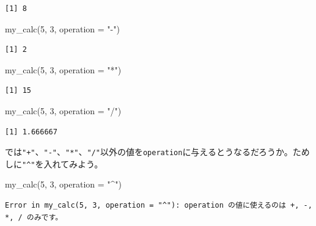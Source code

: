 \documentclass[
  a4paper,
  pandoc,
  ja=standard,
  jafont=haranoaji]{bxjsbook}
\newenvironment{Shaded}{\begin{snugshade}}{\end{snugshade}}
\newcommand{\AttributeTok}[1]{\textcolor[rgb]{0.00,0.48,0.65}{#1}}
\newcommand{\DecValTok}[1]{\textcolor[rgb]{0.68,0.00,0.00}{#1}}
\newcommand{\FunctionTok}[1]{\textcolor[rgb]{0.28,0.35,0.67}{#1}}
\newcommand{\NormalTok}[1]{\textcolor[rgb]{0.00,0.48,0.65}{#1}}
\newcommand{\StringTok}[1]{\textcolor[rgb]{0.13,0.47,0.30}{#1}}
\begin{document}
\begin{verbatim}
[1] 8
\end{verbatim}

\begin{Shaded}
\begin{Highlighting}[numbers=left,,]
\FunctionTok{my\_calc}\NormalTok{(}\DecValTok{5}\NormalTok{, }\DecValTok{3}\NormalTok{, }\AttributeTok{operation =} \StringTok{"{-}"}\NormalTok{)}
\end{Highlighting}
\end{Shaded}

\begin{verbatim}
[1] 2
\end{verbatim}

\begin{Shaded}
\begin{Highlighting}[numbers=left,,]
\FunctionTok{my\_calc}\NormalTok{(}\DecValTok{5}\NormalTok{, }\DecValTok{3}\NormalTok{, }\AttributeTok{operation =} \StringTok{"*"}\NormalTok{)}
\end{Highlighting}
\end{Shaded}

\begin{verbatim}
[1] 15
\end{verbatim}

\begin{Shaded}
\begin{Highlighting}[numbers=left,,]
\FunctionTok{my\_calc}\NormalTok{(}\DecValTok{5}\NormalTok{, }\DecValTok{3}\NormalTok{, }\AttributeTok{operation =} \StringTok{"/"}\NormalTok{)}
\end{Highlighting}
\end{Shaded}

\begin{verbatim}
[1] 1.666667
\end{verbatim}

では\texttt{"+"}、\texttt{"-"}、\texttt{"*"}、\texttt{"/"}以外の値を\texttt{operation}に与えるとうなるだろうか。ためしに\texttt{"\^{}"}を入れてみよう。

\begin{Shaded}
\begin{Highlighting}[numbers=left,,]
\FunctionTok{my\_calc}\NormalTok{(}\DecValTok{5}\NormalTok{, }\DecValTok{3}\NormalTok{, }\AttributeTok{operation =} \StringTok{"\^{}"}\NormalTok{)}
\end{Highlighting}
\end{Shaded}

\begin{verbatim}
Error in my_calc(5, 3, operation = "^"): operation の値に使えるのは +, -, *, / のみです。
\end{verbatim}
\end{document}
